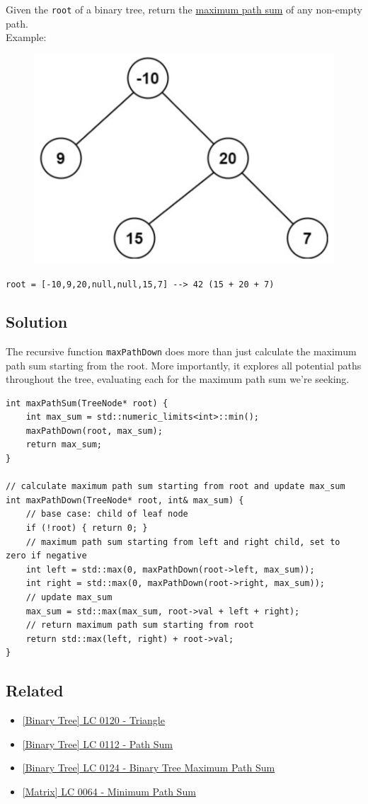 Given the {\colorbox{CodeBackground}{\lstinline|root|}} of a binary tree, return the \ul{maximum path sum} of any non-empty path.\\

Example:
\begin{figure}[H]
	\centering
	\includegraphics[width=0.35\linewidth]{images/lc0124_example}
	\label{fig:lc0124example}
\end{figure}
{\colorbox{CodeBackground}{\lstinline|root = [-10,9,20,null,null,15,7] --> 42 (15 + 20 + 7)|}}

\subsection*{Solution}
The recursive function {\colorbox{CodeBackground}{\lstinline|maxPathDown|}} does more than just calculate the maximum path sum starting from the root. More importantly, it explores all potential paths throughout the tree, evaluating each for the maximum path sum we're seeking.
\begin{lstlisting}
int maxPathSum(TreeNode* root) {
	int max_sum = std::numeric_limits<int>::min();
	maxPathDown(root, max_sum);
	return max_sum;
}

// calculate maximum path sum starting from root and update max_sum
int maxPathDown(TreeNode* root, int& max_sum) {
	// base case: child of leaf node
	if (!root) { return 0; }
	// maximum path sum starting from left and right child, set to zero if negative
	int left = std::max(0, maxPathDown(root->left, max_sum));
	int right = std::max(0, maxPathDown(root->right, max_sum));
	// update max_sum
	max_sum = std::max(max_sum, root->val + left + right);
	// return maximum path sum starting from root
	return std::max(left, right) + root->val;
}
\end{lstlisting}

\subsection*{Related}
\begin{itemize}
	\item \hyperref[lc0120]{[Binary Tree] LC 0120 - Triangle}
	\item \hyperref[lc0112]{[Binary Tree] LC 0112 - Path Sum}
	\item \hyperref[lc0124]{[Binary Tree] LC 0124 - Binary Tree Maximum Path Sum}
	\item \hyperref[lc0064]{[Matrix] LC 0064 - Minimum Path Sum}
\end{itemize}

